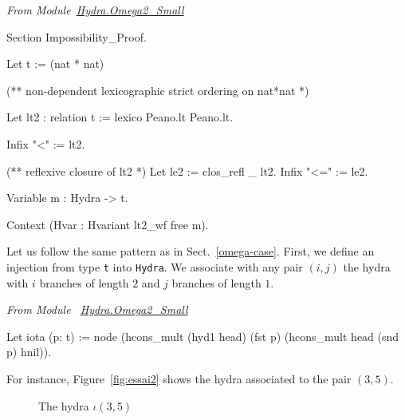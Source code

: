 \vspace{4pt}
\emph{From Module~\href{../src/html/hydras.Hydra.Omega2_Small.html}{Hydra.Omega2\_Small}}


\begin{Coqsrc}
  Section Impossibility_Proof.
  
  Let t := (nat * nat)%

  (** non-dependent lexicographic strict ordering on nat*nat *)
  
  Let lt2 : relation t := lexico Peano.lt Peano.lt.

  Infix "<" := lt2.
  
  (** reflexive closure of lt2 *)
  Let le2 := clos_refl _ lt2.
  Infix "<=" := le2.

  Variable m : Hydra -> t.
  
  Context (Hvar : Hvariant lt2_wf free m).
\end{Coqsrc}


Let us follow the same pattern as in Sect.~\ref{omega-case}.
First, we define an injection from type \texttt{t} into \texttt{Hydra}.
We associate with any pair $(i,j)$ the hydra with $i$ branches of length $2$ and
$j$ branches of length $1$.


\vspace{4pt}
\emph{From Module ~\href{../src/html/hydras.Hydra.Omega2_Small.html\#iota}{Hydra.Omega2\_Small}}

\begin{Coqsrc}
  Let iota (p: t) := 
    node (hcons_mult (hyd1 head) (fst p)
                     (hcons_mult head (snd p) hnil)).
\end{Coqsrc}

For instance, Figure~\vref{fig:essai2} shows the hydra associated to the pair
$(3,5)$. 

\begin{figure}[htb]
\centering
{}
\caption{\label{fig:essai2}
The hydra $\iota(3,5)$}
\end{figure}




